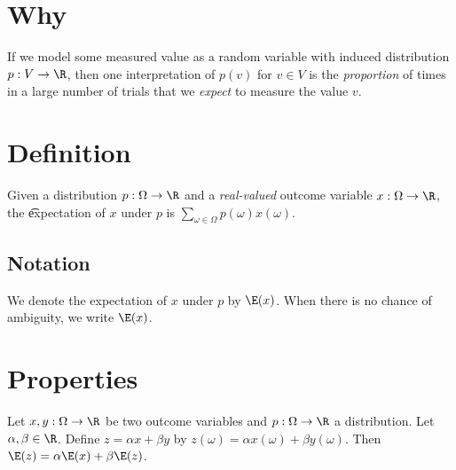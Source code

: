 
\section*{Why}

If we model some measured value as a random variable with induced distribution $p: V \to \R $, then one interpretation of $p(v)$ for $v \in V$ is the \textit{proportion} of times in a large number of trials that we \textit{expect} to measure the value $v$.

\section*{Definition}

Given a distribution $p: \Omega  \to \R $ and a \textit{real-valued} outcome variable $x: \Omega  \to \R $, the \t{expectation} of $x$ under $p$ is $\sum_{\omega  \in \Omega } p(\omega )x(\omega )$.

\subsection*{Notation}

We denote the expectation of $x$ under $p$ by $\E (x)$.
When there is no chance of ambiguity, we write $\E (x)$.

\section*{Properties}

Let $x, y : \Omega  \to \R $ be two outcome variables and $p: \Omega  \to \R $ a distribution.
Let $\alpha , \beta  \in \R $.
Define $z = \alpha x + \beta y$ by $z(\omega ) = \alpha x(\omega ) + \beta y(\omega )$.
Then $\E (z) = \alpha \E (x) + \beta \E (z)$.

\blankpage
